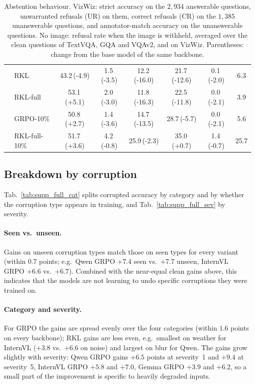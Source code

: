 \begin{table}[t]
\begin{tabular}{llcccc|cc}
 & RKL & 43.2\,{\scriptsize(-4.9)} & 1.5\,{\scriptsize(-3.5)} & 12.2\,{\scriptsize(-16.0)} & 21.7\,{\scriptsize(-12.6)} & 0.1\,{\scriptsize(-2.0)} & 6.3 \\
 & RKL-full & 53.1\,{\scriptsize(+5.1)} & 2.0\,{\scriptsize(-3.0)} & 11.8\,{\scriptsize(-16.3)} & 22.5\,{\scriptsize(-11.8)} & 0.0\,{\scriptsize(-2.1)} & 3.9 \\
 & GRPO-10\% & 50.8\,{\scriptsize(+2.7)} & 1.4\,{\scriptsize(-3.6)} & 14.7\,{\scriptsize(-13.5)} & 28.7\,{\scriptsize(-5.7)} & 0.0\,{\scriptsize(-2.1)} & 5.6 \\
 & RKL-full-10\% & 51.7\,{\scriptsize(+3.6)} & 4.2\,{\scriptsize(-0.8)} & 25.9\,{\scriptsize(-2.3)} & 35.0\,{\scriptsize(+0.7)} & 1.4\,{\scriptsize(-0.7)} & 25.7 \\
\bottomrule
\end{tabular}
\caption{Abstention behaviour. VizWiz: strict accuracy on the $2{,}934$ answerable questions,
unwarranted refusals (UR) on them, correct refusals (CR) on the $1{,}385$ unanswerable
questions, and annotator-match accuracy on the unanswerable questions. No image: refusal rate
when the image is withheld, averaged over the clean questions of TextVQA, GQA and VQAv2, and on
VizWiz. Parentheses: change from the base model of the same backbone.}
\label{tab:supp_full_abstain}
\end{table}

\subsection{Breakdown by corruption}
\label{sec:supp_full_corr}

Tab.~\ref{tab:supp_full_cat} splits corrupted accuracy by category and by whether the
corruption type appears in training, and Tab.~\ref{tab:supp_full_sev} by severity.

\paragraph{Seen vs.\ unseen.}
Gains on unseen corruption types match those on seen types for every variant (within
$0.7$ points; e.g.\ Qwen GRPO $+7.4$ seen vs.\ $+7.7$ unseen, InternVL GRPO $+6.6$ vs.\
$+6.7$). Combined with the near-equal clean gains above, this indicates that the models are
not learning to undo specific corruptions they were trained on.

\paragraph{Category and severity.}
For GRPO the gains are spread evenly over the four categories (within $1.6$ points on every
backbone); RKL gains are less even, e.g.\ smallest on weather for InternVL ($+3.8$ vs.\
$+6.6$ on noise) and largest on blur for Qwen. The gains grow slightly with severity:
Qwen GRPO gains $+6.5$ points at severity~1 and $+9.4$ at severity~5, InternVL GRPO $+5.8$
and $+7.0$, Gemma GRPO $+3.9$ and $+6.2$, so a small part of the improvement is specific to
heavily degraded inputs.

